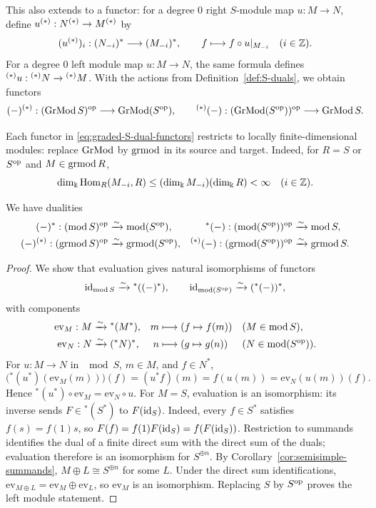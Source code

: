 \begin{advanced}[suppressfirstparskip=true,innertopmargin=0pt]
This also extends to a functor: for a degree $0$ right $S$-module map $u:M\to N$, define $u^{(*)}:N^{(*)}\to M^{(*)}$ by
\[
(u^{(*)})_i:(N_{-i})^*\longrightarrow(M_{-i})^*,
\qquad f\longmapsto f\circ u|_{M_{-i}}
\quad(i\in\mathbb{Z}).
\]
For a degree $0$ left module map $u:M\to N$, the same formula defines ${}^{(*)}u:{}^{(*)}N\to{}^{(*)}M$.
With the actions from Definition~\ref{def:S-duals}, we obtain functors
\begin{equation}\label{eq:graded-S-dual-functors}
(-)^{(*)}:(\operatorname{\mathrm{GrMod}} S)^{\mathrm{op}}\longrightarrow\operatorname{\mathrm{GrMod}}(S^{\mathrm{op}}),\qquad 
{}^{(*)}(-):(\operatorname{\mathrm{GrMod}}(S^{\mathrm{op}}))^{\mathrm{op}}\longrightarrow\operatorname{\mathrm{GrMod}} S.
\end{equation}

Each functor in \eqref{eq:graded-S-dual-functors} restricts to locally finite-dimensional modules: replace $\operatorname{\mathrm{GrMod}}$ by $\operatorname{\mathrm{grmod}}$ in its source and target.
Indeed, for $R=S$ or $S^{\mathrm{op}}$ and $M\in\operatorname{\mathrm{grmod}} R$,
\begin{equation}\label{eq:graded-S-dual-finiteness}
\dim_\Bbbk\operatorname{Hom}\nolimits_R(M_{-i},R)
\leq(\dim_\Bbbk M_{-i})(\dim_\Bbbk R)<\infty
\quad(i\in\mathbb{Z}).
\end{equation}

\begin{lemma}\label{lem:S-bidual}
We have dualities
\[
\begin{aligned}
(-)^*:(\operatorname{\mathrm{mod}} S)^{\mathrm{op}} & \xrightarrow{\sim}\operatorname{\mathrm{mod}}(S^{\mathrm{op}}), & {}^*(-):(\operatorname{\mathrm{mod}}(S^{\mathrm{op}}))^{\mathrm{op}} &\xrightarrow{\sim}\operatorname{\mathrm{mod}} S,\\
(-)^{(*)}:(\operatorname{\mathrm{grmod}} S)^{\mathrm{op}}&\xrightarrow{\sim}\operatorname{\mathrm{grmod}}(S^{\mathrm{op}}), &
{}^{(*)}(-):(\operatorname{\mathrm{grmod}}(S^{\mathrm{op}}))^{\mathrm{op}}&\xrightarrow{\sim}\operatorname{\mathrm{grmod}} S.
\end{aligned}
\]
\end{lemma}

\begin{proof}
We show that evaluation gives natural isomorphisms of functors
\[
\operatorname{id}_{\operatorname{\mathrm{mod}} S}\xrightarrow{\sim}{}^*((-)^*),
\qquad
\operatorname{id}_{\operatorname{\mathrm{mod}}(S^{\mathrm{op}})}\xrightarrow{\sim}({}^*(-))^*,
\]
with components
\[
\begin{aligned}
\mathrm{ev}_M:M&\xrightarrow{\sim}{}^*(M^*),
& m&\longmapsto(f\mapsto f(m))
&& (M\in\operatorname{\mathrm{mod}} S),\\
\mathrm{ev}_N:N&\xrightarrow{\sim}({}^*N)^*,
& n&\longmapsto(g\mapsto g(n))
&& (N\in\operatorname{\mathrm{mod}}(S^{\mathrm{op}})).
\end{aligned}
\]
For $u:M\to N$ in $\mod S$, $m\in M$, and $f\in N^*$,
\[
\bigl({}^*(u^*)(\mathrm{ev}_M(m))\bigr)(f)
=(u^*f)(m)=f(u(m))=\mathrm{ev}_N(u(m))(f).
\]
Hence $ {}^*(u^*)\circ\mathrm{ev}_M=\mathrm{ev}_N\circ u$.
For $M=S$, evaluation is an isomorphism: its inverse sends $F\in{}^*(S^*)$ to $F(\operatorname{id}_S)$.
Indeed, every $f\in S^*$ satisfies $f(s)=f(1)s$, so $F(f)=f(1)F(\operatorname{id}_S)=f(F(\operatorname{id}_S))$.
Restriction to summands identifies the dual of a finite direct sum with the direct sum of the duals; evaluation therefore is an isomorphism for $S^{\oplus n}$.
By Corollary~\ref{cor:semisimple-summands}, $M\oplus L\cong S^{\oplus n}$ for some $L$.
Under the direct sum identifications, $\mathrm{ev}_{M\oplus L}=\mathrm{ev}_M\oplus\mathrm{ev}_L$, so $\mathrm{ev}_M$ is an isomorphism.
Replacing $S$ by $S^{\mathrm{op}}$ proves the left module statement.


\end{proof}
\end{advanced}
